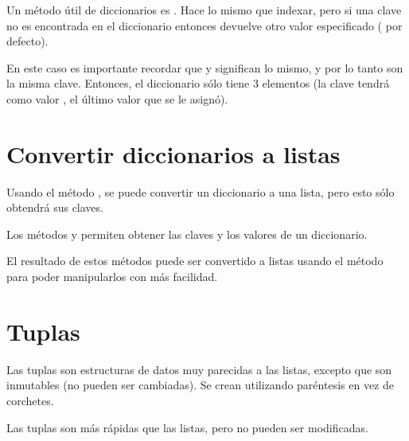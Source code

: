 Un método útil de diccionarios es .
Hace lo mismo que indexar, pero si una clave no es encontrada en el diccionario entonces devuelve otro valor especificado ( por defecto).


En este caso es importante recordar que  y  significan lo mismo, y por lo tanto son la misma clave.
Entonces, el diccionario  sólo tiene 3 elementos (la clave  tendrá como valor , el último valor que se le asignó).


\section{Convertir diccionarios a listas}

Usando el método , se puede convertir un diccionario a una lista, pero esto sólo obtendrá sus claves.


Los métodos  y  permiten obtener las claves y los valores de un diccionario.


El resultado de estos métodos puede ser convertido a listas usando el método  para poder manipularlos con más facilidad.


\section{Tuplas}

Las tuplas son estructuras de datos muy parecidas a las listas, excepto que son inmutables (no pueden ser cambiadas).
Se crean utilizando paréntesis en vez de corchetes.


Las tuplas son más rápidas que las listas, pero no pueden ser modificadas.

